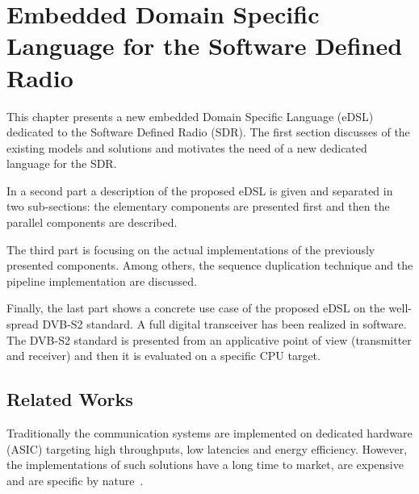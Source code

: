 
\graphicspath{{main/chapter6/fig/}}

\chapter{Embedded Domain Specific Language for the Software Defined Radio}

This chapter presents a new embedded Domain Specific Language (eDSL) dedicated
to the Software Defined Radio (SDR). The first section discusses of the existing
models and solutions and motivates the need of a new dedicated language for the
SDR.

In a second part a description of the proposed eDSL is given and separated in
two sub-sections: the elementary components are presented first and then the
parallel components are described.

The third part is focusing on the actual implementations of the previously
presented components. Among others, the sequence duplication technique and the
pipeline implementation are discussed.

Finally, the last part shows a concrete use case of the proposed eDSL on the
well-spread DVB-S2 standard. A full digital transceiver has been realized in
software. The DVB-S2 standard is presented from an applicative point of view
(transmitter and receiver) and then it is evaluated on a specific CPU target.

\vspace*{\fill}
\minitoccustom
\vspace*{\fill}


\section{Related Works}

Traditionally the communication systems are implemented on dedicated hardware
(ASIC) targeting high throughputs, low latencies and energy efficiency.
However, the implementations of such solutions have a long time to market, are
expensive and are specific by nature~\cite{Palkovic2010,Palkovic2012}.

